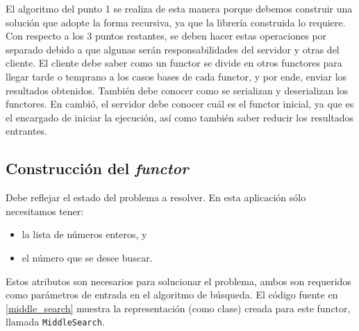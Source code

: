 El algoritmo del punto 1 se realiza de esta manera porque debemos construir una solución que adopte la forma recursiva, ya que la librería
construida lo requiere. Con respecto a los 3 puntos restantes, se deben hacer estas operaciones por separado debido a que algunas serán
responsabilidades del servidor y otras del cliente. El cliente debe saber como un functor se divide en otros functores para llegar tarde o
temprano a los casos bases de cada functor, y por ende, enviar los resultados obtenidos. También debe conocer como se serializan y
deserializan los functores. En cambió, el servidor debe conocer cuál es el functor inicial, ya que es el encargado de iniciar la ejecución,
así como también saber reducir los resultados entrantes.


\subsection{Construcción del \textit{functor}}

Debe reflejar el estado del problema a resolver. En esta aplicación sólo necesitamos tener:
\begin{itemize}
    \item   la lista de números enteros, y
    \item   el número que se desee buscar.
\end{itemize}
Estos atributos son necesarios para solucionar el problema, ambos son requeridos como parámetros de entrada en el algoritmo de búsqueda. El
código fuente en \ref{middle_search} muestra la representación (como clase) creada para este functor, llamada
\texttt{MiddleSearch}.\\

